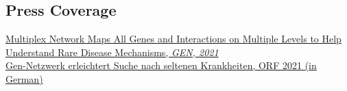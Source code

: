 \documentclass[margin,line]{resume}
\begin{document}
\begin{resume}
    \section{\mysidestyle Press Coverage}
   \href{https://www.genengnews.com/news/multiplex-network-maps-all-genes-and-interactions-on-multiple-levels-to-help-understand-rare-disease-mechanisms/}{Multiplex Network Maps All Genes and Interactions on Multiple Levels to Help Understand Rare Disease Mechanisms, \textit{GEN, 2021}}  \vspace{1mm}\\
   \href{https://science.orf.at/stories/3209714/}{Gen-Netzwerk erleichtert Suche nach seltenen Krankheiten, ORF 2021 (in German)}


\vspace{4mm}
          

\end{resume}
\end{document}
